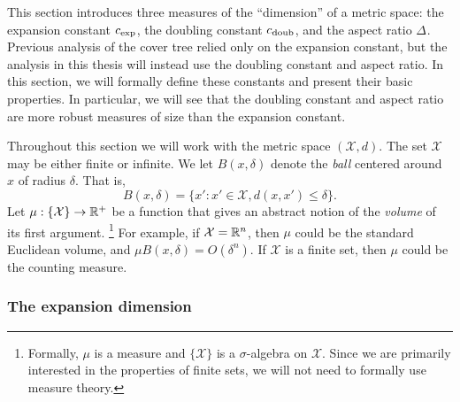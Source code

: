 \documentclass[../main.tex]{subfiles}
\newcommand{\set}[1]{\mathcal {#1}}
\newcommand{\dist}[2]{\distf({#1},{#2})}
\newcommand{\distf}{d}
\newcommand{\aspect}[1]{\Delta_{#1}}
\newcommand{\cexp}{c_\textnormal{exp}}
\newcommand{\cdoub}{c_\textnormal{doub}}
\begin{document}
This section introduces three measures of the ``dimension'' of a metric space:
the expansion constant $\cexp$, the doubling constant $\cdoub$, and the aspect ratio $\aspect{}$.
Previous analysis of the cover tree relied only on the expansion constant,
but the analysis in this thesis will instead use the doubling constant and aspect ratio.
In this section, we will formally define these constants and present their basic properties.
In particular, we will see that the doubling constant and aspect ratio are more robust measures of size than the expansion constant.

Throughout this section we will work with the metric space $(\set X,d)$.
The set $\set X$ may be either finite or infinite.
We let $B(x,\delta)$ denote the \emph{ball} centered around $x$ of radius $\delta$. 
That is,
\begin{equation}
    B(x,\delta) = \{ x' : x'\in\set X, \dist{x}{x'} \le \delta \}.
\end{equation}
Let $\mu : \{\set X\} \to \R^+$ be a function that gives an abstract notion of the \emph{volume} of its first argument.%
\footnote{
    Formally, $\mu$ is a measure and $\{\set X\}$ is a $\sigma$-algebra on $\set X$.
    Since we are primarily interested in the properties of finite sets,
    we will not need to formally use measure theory.
}
For example, if $\set X=\R^n$, then $\mu$ could be the standard Euclidean volume,
and $\mu B(x,\delta) = O(\delta^n)$.
If $\set X$ is a finite set, then $\mu$ could be the counting measure.


\subsubsection{The expansion dimension}
\end{document}

